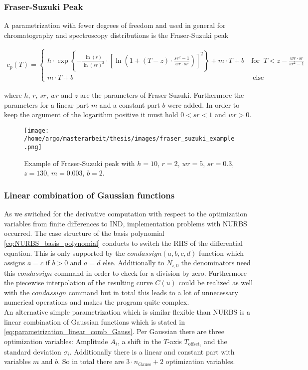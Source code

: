 \documentclass{scrartcl}[12pt, halfparskip]
\begin{document}
\subsubsection{Fraser-Suzuki Peak}
A parametrization with fewer degrees of freedom and used in general for chromatography and spectroscopy distributions is the Fraser-Suzuki peak \cite{fraser_suzuki_1} \cite{fraser_suzuki_many_fcts}

\begin{align}
	c_p(T) =
	\begin{cases}
		h \cdot \exp \left\{ - \frac{\ln(r)}{\ln(sr)^2} \cdot \left[ \ln\left( 1 + (T-z) \cdot \frac{sr^2 - 1}{wr \cdot sr} \right) \right]^2 \right\} + m \cdot T + b \ & \text{for } \ T < z - \frac{wr \cdot sr}{sr^2 - 1} \\
		m \cdot T + b \ & \ \text{else}
	\end{cases}
	\label{eq:fraser_suzuki}
\end{align}

where $h$, $r$, $sr$, $wr$ and $z$ are the parameters of Fraser-Suzuki. Furthermore the parameters for a linear part $m$ and a constant part $b$ were added. In order to keep the argument of the logarithm positive it must hold $0 < sr < 1$ and $wr > 0$.

\begin{figure}[H]
	\centering
	\texttt{[image: /home/argo/masterarbeit/thesis/images/fraser\_suzuki\_example.png]}
	\caption{Example of Fraser-Suzuki peak with $h=10$, $r=2$, $wr=5$, $sr=0.3$, $z=130$, $m=0.003$, $b=2$.}
	\label{fig:parametrization_example_fraser_suzuki}
\end{figure}



\subsubsection{Linear combination of Gaussian functions}
As we switched for the derivative computation with respect to the optimization variables from finite differences to IND, implementation problems with NURBS occurred. 
The case structure of the basis polynomial \eqref{eq:NURBS_basis_polynomial} conducts to switch the RHS of the differential equation. This is only supported by the $condassign(a,b,c,d)$ function which assigns $a=c$ if $b>0$ and $a=d$ else. Additionally to $N_{i,0}$ the denominators need this $condassign$ command in order to check for a division by zero. 
Furthermore the piecewise interpolation of the resulting curve $C(u)$ could be realized as well with the $condassign$ command but in total this leads to a lot of unnecessary numerical operations and makes the program quite complex. \\
An alternative simple parametrization which is similar flexible than NURBS is a linear combination of Gaussian functions which is stated in \eqref{eq:parametrization_linear_comb_Gauss}. Per Gaussian there are three optimization variables: Amplitude $A_i$, a shift in the $T$-axis $T_{\text{offset}_i}$ and the standard deviation $\sigma_i$. Additionally there is a linear and constant part with variables $m$ and $b$. So in total there are $3 \cdot n_{\text{Gauss}} + 2$ optimization variables. \\
\end{document}
